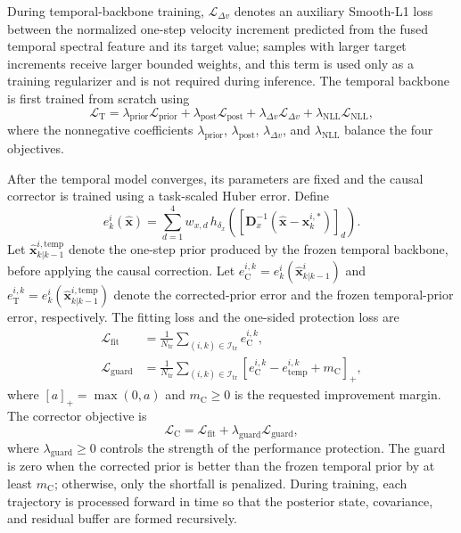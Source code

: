 \documentclass[10pt,doublecolumn]{IEEEtaes}
\begin{document}
During temporal-backbone training, $\mathcal{L}_{\Delta v}$ denotes an auxiliary Smooth-L1 loss between the normalized one-step velocity increment predicted from the fused temporal spectral feature and its target value; samples with larger target increments receive larger bounded weights, and this term is used only as a training regularizer and is not required during inference. The temporal backbone is first trained from scratch using
\begin{equation}
\mathcal{L}_{\mathrm{T}}=
\lambda_{\mathrm{prior}}\mathcal{L}_{\mathrm{prior}}+
\lambda_{\mathrm{post}}\mathcal{L}_{\mathrm{post}}+
\lambda_{\Delta v}\mathcal{L}_{\Delta v}+
\lambda_{\mathrm{NLL}}\mathcal{L}_{\mathrm{NLL}},
\label{eq:temporal_loss}
\end{equation}
where the nonnegative coefficients $\lambda_{\mathrm{prior}}$, $\lambda_{\mathrm{post}}$, $\lambda_{\Delta v}$, and $\lambda_{\mathrm{NLL}}$ balance the four objectives.

After the temporal model converges, its parameters are fixed and the causal corrector is trained using a task-scaled Huber error. Define
\begin{equation}
e_k^i(\hat{\mathbf{x}})=
\sum_{d=1}^{4}w_{x,d}\,
h_{\delta_{x}}\!\left(
[\mathbf{D}_{x}^{-1}(\hat{\mathbf{x}}-\mathbf{x}_k^{i,*})]_d
\right).
\label{eq:corrector_state_error}
\end{equation}
Let \(\hat{\mathbf{x}}_{k|k-1}^{i,\mathrm{temp}}\) denote the one-step prior produced by the frozen temporal backbone, before applying the causal correction.
Let $e_{\mathrm{C}}^{i,k}=e_k^i(\hat{\mathbf{x}}_{k|k-1}^{i})$ and $e_{\mathrm{T}}^{i,k}=e_k^i(\hat{\mathbf{x}}_{k|k-1}^{i,\mathrm{temp}})$ denote the corrected-prior error and the frozen temporal-prior error, respectively. The fitting loss and the one-sided protection loss are
\begin{align}
\mathcal{L}_{\mathrm{fit}}
&=\frac{1}{N_{\mathrm{tr}}}
\sum_{(i,k)\in\mathcal{I}_{\mathrm{tr}}}
e_{\mathrm{C}}^{i,k},\\
\mathcal{L}_{\mathrm{guard}}
&= \frac{1}{N_{\mathrm{tr}}}
\sum_{(i,k)\in\mathcal{I}_{\mathrm{tr}}}
\left[
e_{\mathrm C}^{i,k}
-e_{\mathrm{temp}}^{i,k}
+m_{\mathrm C}
\right]_+ 
,
\label{eq:correction_guard_loss}
\end{align}
where $[a]_{+}=\max(0,a)$ and $m_{\mathrm{C}}\geq0$ is the requested improvement margin. The corrector objective is
\begin{equation}
\mathcal{L}_{\mathrm{C}}=
\mathcal{L}_{\mathrm{fit}}+
\lambda_{\mathrm{guard}}\mathcal{L}_{\mathrm{guard}},
\label{eq:correction_loss}
\end{equation}
where $\lambda_{\mathrm{guard}}\geq0$ controls the strength of the performance protection. The guard is zero when the corrected prior is better than the frozen temporal prior by at least $m_{\mathrm{C}}$; otherwise, only the shortfall is penalized. During training, each trajectory is processed forward in time so that the posterior state, covariance, and residual buffer are formed recursively.
\end{document}
